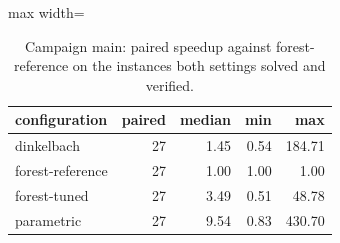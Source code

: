\begin{table}[tbp]
\centering
\caption{Campaign main: paired speedup against forest-reference on the instances both settings solved and verified.}
\label{tab:main-speedup}
\small
\begin{adjustbox}{max width=\textwidth}
\begin{tabular}{lrrrr}
\toprule
configuration & paired & median & min & max \\
\midrule
dinkelbach & 27 & 1.45 & 0.54 & 184.71 \\
forest-reference & 27 & 1.00 & 1.00 & 1.00 \\
forest-tuned & 27 & 3.49 & 0.51 & 48.78 \\
parametric & 27 & 9.54 & 0.83 & 430.70 \\
\bottomrule
\end{tabular}
\end{adjustbox}
\end{table}
